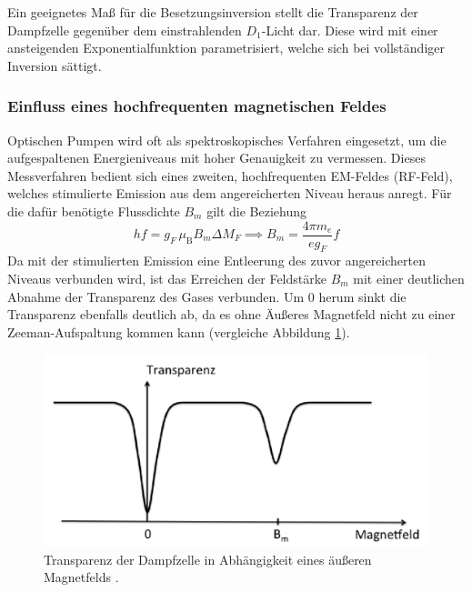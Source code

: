 \noindent Ein geeignetes Maß für die Besetzungsinversion stellt die Transparenz der Dampfzelle gegenüber dem einstrahlenden $D_1$-Licht dar. Diese wird mit einer ansteigenden Exponentialfunktion parametrisiert, welche sich bei vollständiger Inversion sättigt.\\

\subsubsection{Einfluss eines hochfrequenten magnetischen Feldes}
Optischen Pumpen wird oft als spektroskopisches Verfahren eingesetzt, um die aufgespaltenen Energieniveaus mit hoher Genauigkeit zu vermessen. Dieses Messverfahren bedient sich eines zweiten, hochfrequenten EM-Feldes (RF-Feld), welches stimulierte Emission aus dem angereicherten Niveau heraus anregt. Für die dafür benötigte Flussdichte $B_m$ gilt die Beziehung
\begin{equation}
h f = g_F \, \mu_{\text{B}} B_m \Delta M_F \implies B_m = \frac{4 \pi m_e}{e g_F} f
\label{eqn:B_M_Theorie}
\end{equation}
Da mit der stimulierten Emission eine Entleerung des zuvor angereicherten Niveaus verbunden wird, ist das Erreichen der Feldstärke $B_m$ mit einer deutlichen Abnahme der Transparenz des Gases verbunden. %
Um 0 herum sinkt die Transparenz ebenfalls deutlich ab, da es ohne Äußeres Magnetfeld nicht zu einer Zeeman-Aufspaltung kommen kann (vergleiche Abbildung \ref{fig:transparenz}). %

\begin{figure}
    \centering
    \includegraphics[width=\textwidth-120pt,keepaspectratio]{content/images/transparenz.png}
  	\caption{Transparenz der Dampfzelle in Abhängigkeit eines äußeren Magnetfelds \cite{V21}.}
    \label{fig:transparenz}
\end{figure}

